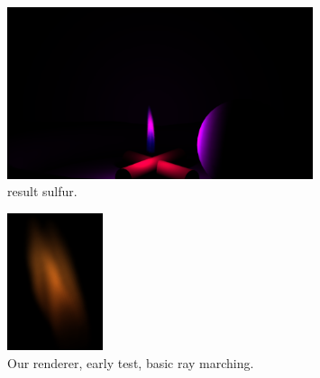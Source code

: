 \begin{figure}[htbp!]
	\centering
	\includegraphics[width=0.8\textwidth, trim={8cm 0 8cm 10cm}, clip]{img/result_sulfur}
	\caption{result sulfur.}
	\label{fig:result_sulfur}
\end{figure}

\begin{figure}[htbp!]
	\centering
	\includegraphics[width=0.25\textwidth]{img/result_synthetic}
	\caption{Our renderer, early test, basic ray marching.}
	\label{fig:result_synthetic}
\end{figure}